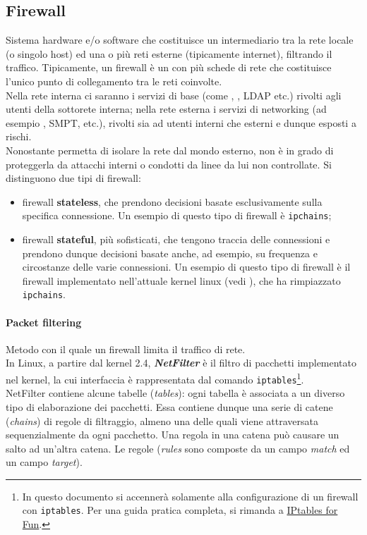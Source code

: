 \documentclass[a4paper, twoside]{article}
\def\code#1{\texttt{#1}}
\def\sub#1{\subsection{#1}\label{#1}}
\def\para#1{\paragraph{#1}\label{#1}}
\def\vedi#1{\nameref{#1}}
\begin{document}
\sub{Firewall} Sistema hardware e/o software che costituisce un intermediario tra la rete locale (o singolo host) ed una o più reti esterne (tipicamente internet), filtrando il traffico. Tipicamente, un firewall è un \vedi{DTE} con più schede di rete che costituisce l'unico punto di collegamento tra le reti coinvolte.\\
Nella rete interna ci saranno i servizi di base (come \vedi{NFS}, \vedi{NIS}, LDAP etc.) rivolti agli utenti della sottorete interna; nella rete esterna i servizi di networking (ad esempio \vedi{DNS}, SMPT, \vedi{FTP} etc.), rivolti sia ad utenti interni che esterni e dunque esposti a rischi.\\
Nonostante permetta di isolare la rete dal mondo esterno, non è in grado di proteggerla da attacchi interni o condotti da linee da lui non controllate.
Si distinguono due tipi di firewall:
\begin{itemize}
\item firewall \textbf{stateless}, che prendono decisioni basate esclusivamente sulla specifica connessione. Un esempio di questo tipo di firewall è \code{ipchains};
\item firewall \textbf{stateful}, più sofisticati, che tengono traccia delle connessioni e prendono dunque decisioni basate anche, ad esempio, su frequenza e circostanze delle varie connessioni. Un esempio di questo tipo di firewall è il firewall implementato nell'attuale kernel linux (vedi \vedi{Packet filtering}), che ha rimpiazzato \code{ipchains}.
\end{itemize}
\para{Packet filtering} Metodo con il quale un firewall limita il traffico di rete.\\
In Linux, a partire dal kernel 2.4, \textit{\textbf{NetFilter}} è il filtro di pacchetti  implementato nel kernel, la cui interfaccia è rappresentata dal comando \code{iptables}\footnote{In questo documento si accennerà solamente alla configurazione di un firewall con \code{iptables}. Per una guida pratica completa, si rimanda a \href{<www.commedia.it/ccontavalli/docs-it/iptables/iptables4dummies.pdf
>}{IPtables for Fun}.}.\\
NetFilter contiene alcune tabelle (\textit{tables}): ogni tabella è associata a un diverso tipo di elaborazione dei pacchetti. Essa contiene dunque una serie di catene (\textit{chains}) di regole di filtraggio, almeno una delle quali viene attraversata sequenzialmente da ogni pacchetto. Una regola in una catena può causare un salto ad un'altra catena. Le regole (\textit{rules} sono composte da un campo \textit{match} ed un campo \textit{target}).
\end{document}
